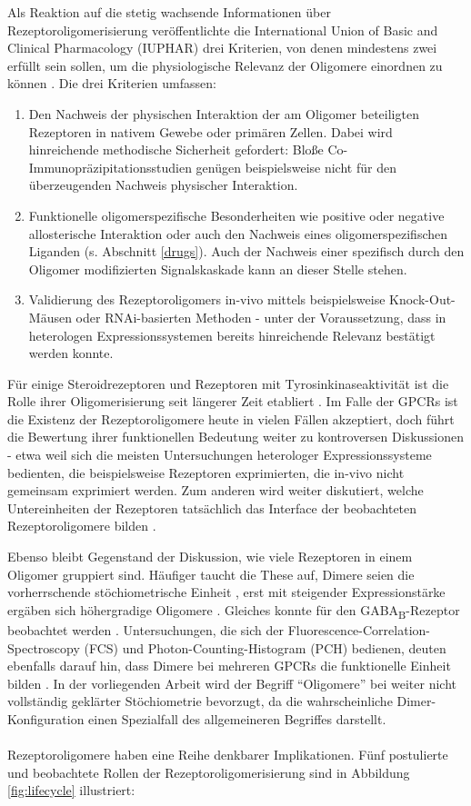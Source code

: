 Als Reaktion auf die stetig wachsende Informationen über Rezeptoroligomerisierung veröffentlichte die International Union of Basic and Clinical Pharmacology (IUPHAR) drei Kriterien, von denen mindestens zwei erfüllt sein sollen, um die physiologische Relevanz der Oligomere einordnen zu können \parencite{Pin2007}. Die drei Kriterien umfassen:
\begin{enumerate}
\item Den Nachweis der physischen Interaktion der am Oligomer beteiligten Rezeptoren in nativem Gewebe oder primären Zellen. Dabei wird hinreichende methodische Sicherheit gefordert: Bloße Co-Immunopräzipitationsstudien genügen beispielsweise nicht für den überzeugenden Nachweis physischer Interaktion.
\item Funktionelle oligomerspezifische Besonderheiten wie positive oder negative allosterische Interaktion oder auch den Nachweis eines oligomerspezifischen Liganden (s. Abschnitt \ref{drugs}). Auch der Nachweis einer spezifisch durch den Oligomer modifizierten Signalskaskade kann an dieser Stelle stehen.
\item Validierung des Rezeptoroligomers in-vivo mittels beispielsweise Knock-Out-Mäusen oder RNAi-basierten Methoden - unter der Voraussetzung, dass in heterologen Expressionssystemen bereits hinreichende Relevanz bestätigt werden konnte. 

\end{enumerate}
Für einige Steroidrezeptoren und Rezeptoren mit Tyrosinkinaseaktivität ist die Rolle ihrer Oligomerisierung seit längerer Zeit etabliert \parencite{Heldin1995}. Im Falle der GPCRs ist die Existenz der Rezeptoroligomere heute in vielen Fällen akzeptiert, doch führt die Bewertung ihrer funktionellen Bedeutung weiter zu kontroversen Diskussionen - etwa weil sich die meisten Untersuchungen heterologer Expressionssysteme bedienten, die beispielsweise Rezeptoren exprimierten, die in-vivo nicht gemeinsam exprimiert werden. Zum anderen wird weiter diskutiert, welche Untereinheiten der Rezeptoren tatsächlich das Interface der beobachteten Rezeptoroligomere bilden \parencite{Terrillon2004}. 

Ebenso bleibt Gegenstand der Diskussion, wie viele Rezeptoren in einem Oligomer gruppiert sind. Häufiger taucht die These auf, Dimere seien die vorherrschende stöchiometrische Einheit \parencite{Dorsch2009}, erst mit steigender Expressionstärke ergäben sich höhergradige Oligomere \parencite{Calebiro2013}. Gleiches konnte für den GABA\textsubscript{B}-Rezeptor beobachtet werden \parencite{Maurel2008, Comps-agrar2011}. Untersuchungen, die sich der Fluorescence-Correlation-Spectroscopy (FCS) und Photon-Counting-Histogram (PCH) bedienen, deuten ebenfalls darauf hin, dass Dimere bei mehreren GPCRs die funktionelle Einheit bilden \parencite{Herrick-Davis2013}. In der vorliegenden Arbeit wird der Begriff "`Oligomere"' bei weiter nicht vollständig geklärter Stöchiometrie bevorzugt, da die wahrscheinliche Dimer-Konfiguration einen Spezialfall des allgemeineren Begriffes darstellt.
\\ \\
Rezeptoroligomere haben eine Reihe denkbarer Implikationen. Fünf postulierte und beobachtete Rollen der Rezeptoroligomerisierung sind in Abbildung \ref{fig:lifecycle} illustriert:

